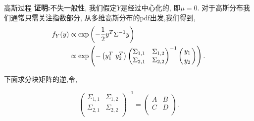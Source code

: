 \documentclass[10pt,mathserif]{beamer}
\theoremstyle{definition}
\numberwithin{equation}{section} %
\begin{document}
    \begin{frame}[fragile]{高斯过程}
        \textbf{证明:}不失一般性, 我们假定$Y$是经过中心化的, 即$\mu=0$. 对于高斯分布我们通常只需关注指数部分, 从多维高斯分布的pdf出发,我们得到,
        \begin{align}\label{A2.7}
            f_{Y}(y)&\propto\mathrm{exp}\left(-\frac{1}{2}y^{T}\Sigma^{-1}y\right) \notag \\
            &\propto\mathrm{exp}\left( -\left(y^{T}_{1}\ y^{T}_{2}\right)
            \begin{pmatrix}
                \Sigma_{1,1} & \Sigma_{1,2} \\
                \Sigma_{2,1} & \Sigma_{2,2} \\
            \end{pmatrix}^{-1}
            \left({y_{1}\atop y_{2}}\right)\right).
        \end{align}

        下面求分块矩阵的逆,令,

        \begin{equation}
            \begin{pmatrix}
                \Sigma_{1,1} & \Sigma_{1,2} \\
                \Sigma_{2,1} & \Sigma_{2,2} \\
            \end{pmatrix}^{-1}=
            \begin{pmatrix}
                A & B \\
                C & D \\
            \end{pmatrix}.
        \end{equation}
    \end{frame}
\end{document}
